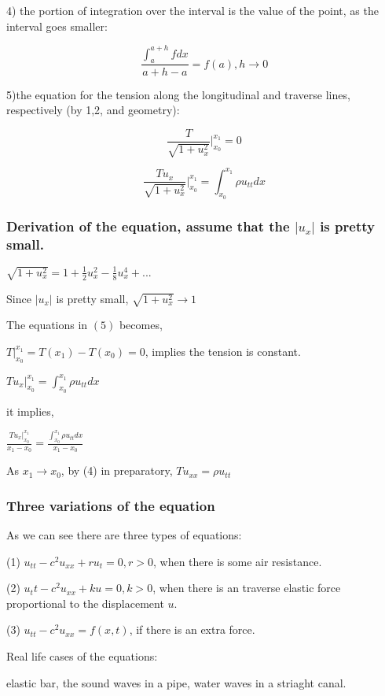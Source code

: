 \documentclass{article}
\begin{document}
4) the portion of integration over the interval is the value of the point, as the interval goes smaller:

$$\frac{\int_a^{a+h} f dx}{a+h-a} = f(a), h \rightarrow 0$$

5)the equation for the tension along the longitudinal and traverse lines, respectively (by 1,2, and geometry):

$$\frac{T}{\sqrt{1+u_x^2}}\Big|_{x_0}^{x_1} = 0$$ 

$$\frac{Tu_x}{\sqrt{1+u_x^2}}\Big|_{x_0}^{x_1} = \int_{x_0}^{x_1} \rho u_{tt} dx$$ 

\subsubsection{Derivation of the equation, assume that the $|u_x|$ is pretty small. }

$\sqrt{1+u_x^2} = 1 + \frac{1}{2} u_x^2 - \frac{1}{8}u_x^4 + ...$

Since $|u_x|$ is pretty small, $\sqrt{1+u_x^2} \rightarrow 1$

The equations in $(5)$ becomes,

$T |_{x_0}^{x_1} = T(x_1)-T(x_0) = 0$, implies the tension is constant.

$T u_x |_{x_0}^{x_1} =  \int_{x_0}^{x_1} \rho u_{tt} dx$

it implies,

$\frac{T u_x |_{x_0}^{x_1}}{x_1-x_0} =  \frac{\int_{x_0}^{x_1} \rho u_{tt}dx}{x_1 - x_0}$

As $x_1 \rightarrow x_0$, by (4) in preparatory, $Tu_{xx} =  \rho u_{tt}$

\subsubsection{Three variations of the equation}

As we can see there are three types of  equations: 


(1) $u_{tt} - c^2 u_{xx} + r u_t =0,r > 0$, when there is some air resistance. 


(2) $u_tt - c^2 u_{xx} + ku = 0, k > 0$, when there is an traverse elastic force proportional to the displacement $u$.

(3) $u_{tt}-c^2u_{xx} = f(x,t)$, if there is an extra force. 

Real life cases of the equations:

elastic bar, the sound waves in a pipe,  water waves in a striaght canal.
\end{document}
